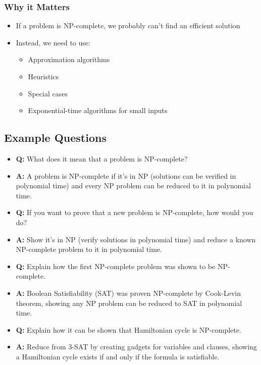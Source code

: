 \documentclass[11pt,a4paper]{article}
\begin{document}
\begin{multicols}{2}
\subsubsection{Why it Matters}
\begin{itemize}
    \item If a problem is NP-complete, we probably can't find an efficient solution
    \item Instead, we need to use:
    \begin{itemize}
        \item Approximation algorithms
        \item Heuristics
        \item Special cases
        \item Exponential-time algorithms for small inputs
    \end{itemize}
\end{itemize}

\subsection{Example Questions}
\begin{itemize}
    \item \textbf{Q:} What does it mean that a problem is NP-complete?
    \item \textbf{A:} A problem is NP-complete if it's in NP (solutions can be verified in polynomial time) and every NP problem can be reduced to it in polynomial time.

    \item \textbf{Q:} If you want to prove that a new problem is NP-complete, how would you do?
    \item \textbf{A:} Show it's in NP (verify solutions in polynomial time) and reduce a known NP-complete problem to it in polynomial time.

    \item \textbf{Q:} Explain how the first NP-complete problem was shown to be NP-complete.
    \item \textbf{A:} Boolean Satisfiability (SAT) was proven NP-complete by Cook-Levin theorem, showing any NP problem can be reduced to SAT in polynomial time.

    \item \textbf{Q:} Explain how it can be shown that Hamiltonian cycle is NP-complete.
    \item \textbf{A:} Reduce from 3-SAT by creating gadgets for variables and clauses, showing a Hamiltonian cycle exists if and only if the formula is satisfiable.


\end{itemize}
\end{multicols}
\end{document}
